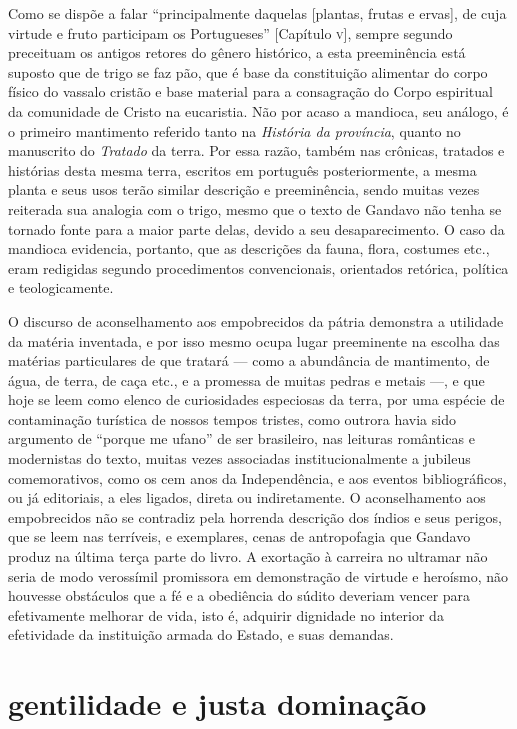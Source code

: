 Como se dispõe a falar ``principalmente daquelas [plantas,
frutas e ervas], de cuja virtude e fruto participam os
Portugueses'' [Capítulo \textsc{v}], sempre segundo preceituam os
antigos retores do gênero histórico, a esta preeminência está suposto
que de trigo se faz pão, que é base da constituição alimentar do corpo
físico do vassalo cristão e base material para a consagração do Corpo
espiritual da comunidade de Cristo na eucaristia. Não por acaso a
mandioca, seu análogo, é o primeiro mantimento referido tanto na
\textit{História da província}, quanto no manuscrito do \textit{Tratado} da terra. Por
essa razão, também nas crônicas, tratados e histórias desta mesma
terra, escritos em português posteriormente, a mesma planta e seus usos
terão similar descrição e preeminência, sendo muitas vezes reiterada
sua analogia com o trigo, mesmo que o texto de Gandavo não tenha se
tornado fonte para a maior parte delas, devido a seu desaparecimento. O
caso da mandioca evidencia, portanto, que as descrições da fauna,
flora, costumes etc., eram redigidas segundo procedimentos
convencionais, orientados retórica, política e teologicamente.

O discurso de aconselhamento aos empobrecidos da pátria demonstra a
utilidade da matéria inventada, e por isso mesmo ocupa lugar
preeminente na escolha das matérias particulares de que tratará --- como
a abundância de mantimento, de água, de terra, de caça etc., e a
promessa de muitas pedras e metais ---, e que hoje se leem como elenco de
curiosidades especiosas da terra, por uma espécie de contaminação
turística de nossos tempos tristes, como outrora havia sido argumento
de ``porque me ufano'' de ser brasileiro, nas leituras românticas e
modernistas do texto, muitas vezes associadas institucionalmente a
jubileus comemorativos, como os cem anos da Independência, e aos
eventos bibliográficos, ou já editoriais, a eles ligados, direta ou
indiretamente. O aconselhamento aos empobrecidos não se contradiz pela
horrenda descrição dos índios e seus perigos, que se leem nas
terríveis, e exemplares, cenas de antropofagia que Gandavo produz na
última terça parte do livro. A exortação à carreira no ultramar não
seria de modo verossímil promissora em demonstração de virtude e heroísmo,
não houvesse obstáculos que a fé e a obediência do súdito deveriam
vencer para efetivamente melhorar de vida, isto é, adquirir dignidade
no interior da efetividade da instituição armada do Estado, e suas
demandas.

\section{gentilidade e justa dominação}


